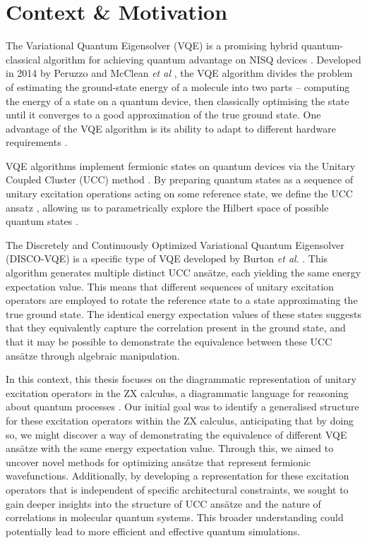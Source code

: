 \section{Context \& Motivation}%
\label{context-motivation}

The Variational Quantum Eigensolver (VQE) is a promising hybrid quantum-classical algorithm for achieving quantum advantage on NISQ devices \cite{Cerezo2020}. Developed in 2014 by Peruzzo and McClean \textit{et al} \cite{Peruzzo2014}, the VQE algorithm divides the problem of estimating the ground-state energy of a molecule into two parts -- computing the energy of a state on a quantum device, then classically optimising the state until it converges to a good approximation of the true ground state. One advantage of the VQE algorithm is its ability to adapt to different hardware requirements \cite{McClean2016}.

VQE algorithms implement fermionic states on quantum devices via the Unitary Coupled Cluster (UCC) method \cite{Taube2006}. By preparing quantum states as a sequence of unitary excitation operations acting on some reference state, we define the UCC ansatz \cite{Burton2023}, allowing us to parametrically explore the Hilbert space of possible quantum states \cite{McClean2016}.

The Discretely and Continuously Optimized Variational Quantum Eigensolver (DISCO-VQE) is a specific type of VQE developed by Burton \textit{et al}. \cite{Burton2023}. This algorithm generates multiple distinct UCC ansätze, each yielding the same energy expectation value. This means that different sequences of unitary excitation operators are employed to rotate the reference state to a state approximating the true ground state. The identical energy expectation values of these states suggests that they equivalently capture the correlation present in the ground state, and that it may be possible to demonstrate the equivalence between these UCC ansätze through algebraic manipulation.

In this context, this thesis focuses on the diagrammatic representation of unitary excitation operators in the ZX calculus, a diagrammatic language for reasoning about quantum processes \cite{Coecke2011}. Our initial goal was to identify a generalised structure for these excitation operators within the ZX calculus, anticipating that by doing so, we might discover a way of demonstrating the equivalence of different VQE ansätze with the same energy expectation value. Through this, we aimed to uncover novel methods for optimizing ansätze that represent fermionic wavefunctions. Additionally, by developing a representation for these excitation operators that is independent of specific architectural constraints, we sought to gain deeper insights into the structure of UCC ansätze and the nature of correlations in molecular quantum systems. This broader understanding could potentially lead to more efficient and effective quantum simulations.

